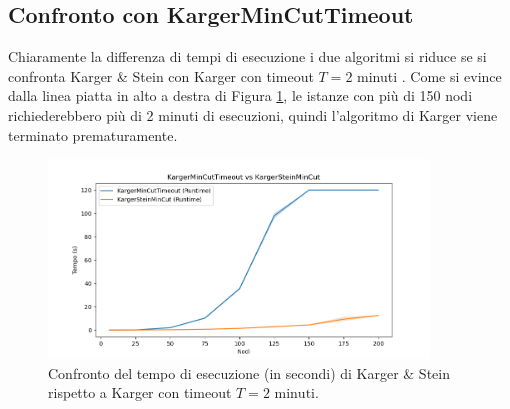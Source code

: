 \subsection{Confronto con KargerMinCutTimeout}

\noindent Chiaramente la differenza di tempi di esecuzione i due algoritmi si riduce se si confronta Karger \& Stein con Karger con timeout $T = 2$ minuti . Come si evince dalla linea piatta in alto a destra di Figura \ref{fig:karger-timeout-vs-karger-stein}, le istanze con più di 150 nodi richiederebbero più di 2 minuti di esecuzioni, quindi l'algoritmo di Karger viene terminato prematuramente.

\begin{figure}[H]
    \centering

    \includegraphics[width=0.9\textwidth]{./images/karger_timeout_vs_karger_stein.png}

    \caption{Confronto del tempo di esecuzione (in secondi) di Karger \& Stein rispetto a Karger con timeout $T = 2 \text{ minuti}$.}
    \label{fig:karger-timeout-vs-karger-stein}
\end{figure}

